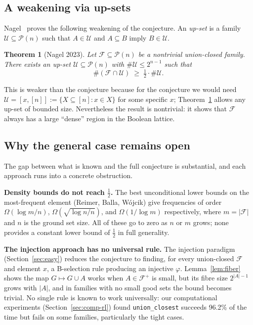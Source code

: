 \documentclass[11pt]{article}
\newtheorem{theorem}{Theorem}[section]
\theoremstyle{definition}
\theoremstyle{remark}
\newcommand{\F}{\mathcal{F}}
\newcommand{\U}{\mathcal{U}}
\newcommand{\Pow}{\mathcal{P}}
\begin{document}
\subsection{A weakening via up-sets}

Nagel~\cite{nagel2023} proves the following weakening of the conjecture.
An \emph{up-set} is a family $\U \subseteq \Pow(n)$ such that
$A \in \U$ and $A \subseteq B$ imply $B \in \U$.

\begin{theorem}[Nagel 2023]
\label{thm:upset}
Let $\F \subseteq \Pow(n)$ be a nontrivial union-closed family.
There exists an up-set $\U \subseteq \Pow(n)$ with
$\#\U \le 2^{n-1}$ such that
\[
  \#(\F \cap \U) \;\ge\; \tfrac{1}{2} \cdot \#\U.
\]
\end{theorem}

This is weaker than the conjecture because for the conjecture we would
need $\U = [x,[n]] := \{X \subseteq [n] : x \in X\}$ for some specific
$x$; Theorem~\ref{thm:upset} allows any up-set of bounded size.
Nevertheless the result is nontrivial: it shows that $\F$ always has
a large ``dense'' region in the Boolean lattice.

\subsection{Why the general case remains open}

The gap between what is known and the full conjecture is substantial, and
each approach runs into a concrete obstruction.

\textbf{Density bounds do not reach $\frac{1}{2}$.}
The best unconditional lower bounds on the most-frequent element
(Reimer, Balla, W\'{o}jcik) give frequencies of order
$\Omega(\log m / n)$, $\Omega(\sqrt{\log n / n})$, and $\Omega(1/\log m)$
respectively, where $m = |\F|$ and $n$ is the ground set size.
All of these go to zero as $n$ or $m$ grows; none provides
a constant lower bound of $\frac{1}{2}$ in full generality.

\textbf{The injection approach has no universal rule.}
The injection paradigm (Section~\ref{sec:easy}) reduces the conjecture to
finding, for every union-closed $\F$ and element $x$, a B-selection rule
producing an injective $\varphi$.
Lemma~\ref{lem:fiber} shows the map $G \mapsto G \cup A$
works when $A \in \F^+$ is small, but its fibre size $2^{|A|-1}$ grows
with $|A|$, and in families with no small good sets the bound becomes trivial.
No single rule is known to work universally: our computational experiments
(Section~\ref{sec:comp-rl}) found {\small\texttt{union\_closest}} succeeds 96.2\%
of the time but fails on some families, particularly the tight cases.
\end{document}
